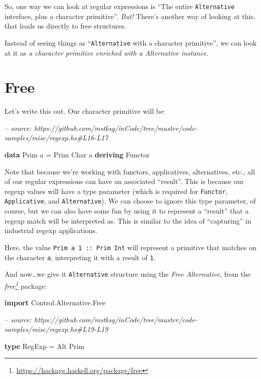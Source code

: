 \documentclass[]{article}
\newenvironment{Shaded}{}{}
\newcommand{\CommentTok}[1]{\textcolor[rgb]{0.38,0.63,0.69}{\textit{#1}}}
\newcommand{\DataTypeTok}[1]{\textcolor[rgb]{0.56,0.13,0.00}{#1}}
\newcommand{\FunctionTok}[1]{\textcolor[rgb]{0.02,0.16,0.49}{#1}}
\newcommand{\KeywordTok}[1]{\textcolor[rgb]{0.00,0.44,0.13}{\textbf{#1}}}
\newcommand{\NormalTok}[1]{#1}
\renewcommand{\href}[2]{#2\footnote{\url{#1}}}
\begin{document}
So, one way we can look at regular expressions is ``The entire
\texttt{Alternative} interface, plus a character primitive''. \emph{But!}
There's another way of looking at this, that leads us directly to free
structures.

Instead of seeing things as ``\texttt{Alternative} with a character primitive'',
we can look at it as \emph{a character primitive enriched with a Alternative
instance}.

\hypertarget{free}{%
\section{Free}\label{free}}

Let's write this out. Our character primitive will be:

\begin{Shaded}
\begin{Highlighting}[]
\CommentTok{-- source: https://github.com/mstksg/inCode/tree/master/code-samples/misc/regexp.hs#L16-L17}

\KeywordTok{data} \DataTypeTok{Prim}\NormalTok{ a }\FunctionTok{=} \DataTypeTok{Prim} \DataTypeTok{Char}\NormalTok{ a}
  \KeywordTok{deriving} \DataTypeTok{Functor}
\end{Highlighting}
\end{Shaded}

Note that because we're working with functors, applicatives, alternatives, etc.,
all of our regular expressions can have an associated ``result''. This is
because our regexp values will have a type parameter (which is required for
\texttt{Functor}, \texttt{Applicative}, and \texttt{Alternative}). We can choose
to ignore this type parameter, of course, but we can also have some fun by using
it to represent a ``result'' that a regexp match will be interpreted as. This is
similar to the idea of ``capturing'' in industrial regexp applications.

Here, the value
\texttt{Prim\ \textquotesingle{}a\textquotesingle{}\ 1\ ::\ Prim\ Int} will
represent a primitive that matches on the character \texttt{a}, interpreting it
with a result of \texttt{1}.

And now\ldots{}we give it \texttt{Alternative} structure using the \emph{Free
Alternative}, from the
\emph{\href{https://hackage.haskell.org/package/free}{free}} package:

\begin{Shaded}
\begin{Highlighting}[]
\KeywordTok{import} \DataTypeTok{Control.Alternative.Free}

\CommentTok{-- source: https://github.com/mstksg/inCode/tree/master/code-samples/misc/regexp.hs#L19-L19}

\KeywordTok{type} \DataTypeTok{RegExp} \FunctionTok{=} \DataTypeTok{Alt} \DataTypeTok{Prim}
\end{Highlighting}
\end{Shaded}
\end{document}
